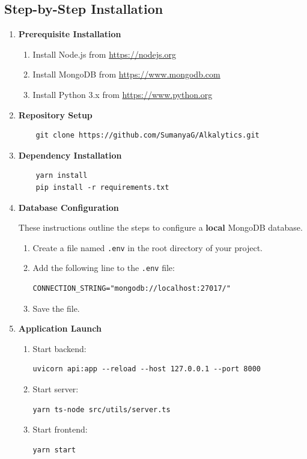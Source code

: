 \documentclass[12pt]{article}
\begin{document}
\subsection{Step-by-Step Installation}
\begin{enumerate}
    \item \textbf{Prerequisite Installation}
    \begin{enumerate}
        \item Install Node.js from \url{https://nodejs.org}
        \item Install MongoDB from \url{https://www.mongodb.com}
        \item Install Python 3.x from \url{https://www.python.org}
    \end{enumerate}
    
    \item \textbf{Repository Setup}
    \begin{verbatim}
    git clone https://github.com/SumanyaG/Alkalytics.git
    \end{verbatim}
    
    \item \textbf{Dependency Installation}
    \begin{verbatim}
    yarn install
    pip install -r requirements.txt
    \end{verbatim}
    
    \item \textbf{Database Configuration}
    
    These instructions outline the steps to configure a \textbf{local} MongoDB
    database.
    \begin{enumerate}
        \item Create a file named \texttt{.env} in the root directory of your
        project.
        \item Add the following line to the \texttt{.env} file:
\begin{verbatim}
CONNECTION_STRING="mongodb://localhost:27017/"
\end{verbatim}
        \item Save the file.
    \end{enumerate}
    
    \item \textbf{Application Launch}
    \begin{enumerate}
        \item Start backend:
\begin{verbatim}
uvicorn api:app --reload --host 127.0.0.1 --port 8000
\end{verbatim}
        \item Start server:
\begin{verbatim}
yarn ts-node src/utils/server.ts
\end{verbatim}
        \item Start frontend:
\begin{verbatim}
yarn start
\end{verbatim}
    \end{enumerate}
\end{enumerate}
\end{document}
